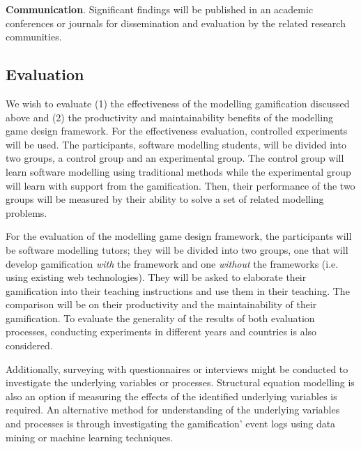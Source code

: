 \documentclass[12pt, a4paper]{report}
\begin{document}
{\textbf{Communication}. Significant findings will be published in an academic conferences or journals for dissemination and evaluation by the related research communities.

\subsection{Evaluation}
We wish to evaluate (1) the effectiveness of the modelling gamification discussed above and (2) the productivity and maintainability benefits of the modelling game design framework. For the effectiveness evaluation, controlled experiments will be used. The participants, software modelling students, will be divided into two groups, a control group and an experimental group. The control group will learn software modelling using traditional methods while the experimental group will learn with support from the gamification. Then, their performance of the two groups will be measured by their ability to solve a set of related modelling problems. 

For the evaluation of the modelling game design framework, the participants will be software modelling tutors; they will be divided into two groups, one that will develop gamification \emph{with} the framework and one \emph{without} the frameworks (i.e. using existing web technologies). They will be asked to elaborate their gamification into their teaching instructions and use them in their teaching. The comparison will be on their productivity and the maintainability of their gamification. To evaluate the generality of the results of both evaluation processes, conducting experiments in different years and countries is also considered.

Additionally, surveying with questionnaires or interviews might be conducted to investigate the underlying variables or processes. Structural equation modelling \cite{hair2016primer} is also an option if measuring the effects of the identified underlying variables is required. An alternative method for understanding of the underlying variables and processes is through investigating the gamification' event logs using data mining or machine learning techniques.

}
\end{document}
